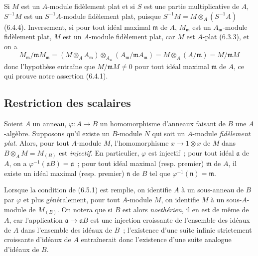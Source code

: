 \begin{env}[6.4.5]
\label{0.6.4.5-fr}
Si $M$ est un $A$-module fidèlement plat et si $S$ est une partie
multiplicative de $A$, $S^{-1}M$ est un $S^{-1}A$-module fidèlement plat,
puisque $S^{-1}M=M\otimes_A(S^{-1}A)$ (6.4.4). Inversement, si pour tout
idéal maximal $\mathfrak{m}$ de $A$, $M_\mathfrak{m}$ est un
$A_\mathfrak{m}$-module fidèlement plat, $M$ est un $A$-module fidèlement
plat, car $M$ est $A$-plat (6.3.3), et on a
\[
  M_\mathfrak{m}/\mathfrak{m}M_\mathfrak{m}
  =(M\otimes_A A_\mathfrak{m})
  \otimes_{A_\mathfrak{m}}
  (A_\mathfrak{m}/\mathfrak{m}A_\mathfrak{m})
  =M\otimes_A(A/\mathfrak{m})
  =M/\mathfrak{m}M
\]
donc l'hypothèse entraîne que $M/\mathfrak{m}M\neq0$ pour tout idéal
maximal $\mathfrak{m}$ de $A$, ce qui prouve notre assertion (6.4.1).
\end{env}

\subsection{Restriction des scalaires}
\label{subsection:0.6.5-fr}

\begin{env}[6.5.1]
\label{0.6.5.1-fr}
Soient $A$ un anneau, $\varphi:A\to B$ un homomorphisme d'anneaux faisant
de $B$ une $A$-algèbre. Supposons qu'il existe un $B$-module $N$ qui soit un
$A$-module \emph{fidèlement plat}. Alors, pour tout $A$-module $M$,
l'homomorphisme $x\to 1\otimes x$ de $M$ dans
$B\otimes_A M=M_{(B)}$ est \emph{injectif}. En particulier, $\varphi$ est
injectif~; pour tout idéal $\mathfrak{a}$ de $A$, on a
$\varphi^{-1}(\mathfrak{a}B)=\mathfrak{a}$~; pour tout idéal maximal (resp.
premier) $\mathfrak{m}$ de $A$, il existe un idéal maximal (resp. premier)
$\mathfrak{n}$ de $B$ tel que $\varphi^{-1}(\mathfrak{n})=\mathfrak{m}$.
\end{env}

\begin{env}[6.5.2]
\label{0.6.5.2-fr}
Lorsque la condition de (6.5.1) est remplie, on identifie $A$ à un
sous-anneau de $B$ par $\varphi$ et plus généralement, pour tout $A$-module
$M$, on identifie $M$ à un sous-$A$-module de $M_{(B)}$. On notera que si
$B$ est alors \emph{noethérien}, il en est de même de $A$, car l'application
$\mathfrak{a}\to\mathfrak{a}B$ est une injection croissante de
l'ensemble des idéaux de $A$ dans l'ensemble des idéaux de $B$~;
l'existence d'une suite infinie strictement croissante d'idéaux de $A$
entraînerait donc l'existence d'une suite analogue d'idéaux de $B$.
\end{env}

